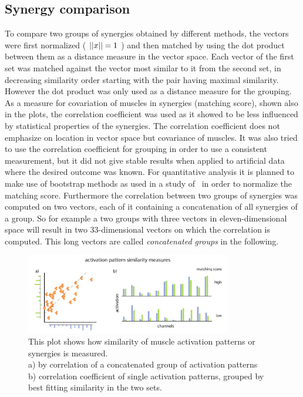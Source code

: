 \subsection{Synergy comparison} %
\label{sg:sub:comp}
To compare two groups of synergies obtained by different methods, the vectors were first normalized ( $\left|\left|x\right|\right| = 1$ ) and then matched by using the dot product between them as a distance measure in the vector space. Each vector of the first set was matched against the vector most similar to it from the second set, in decreasing similarity order starting with the pair having maximal similarity. However the dot product was only used as a distance measure for the grouping. As a measure for covariation of muscles in synergies (matching score), shown also in the plots, the correlation coefficient was used as it showed to be less influenced by statistical properties of the synergies. The correlation coefficient does not emphasize on location in vector space but covariance of muscles. It was also tried to use the correlation coefficient for grouping in order to use a consistent measurement, but it did not give stable results when applied to artificial data where the desired outcome was known. For quantitative analysis it is planned to make use of bootstrap methods as used in a study of~\citet{AdAvella:2005p2330} in order to normalize the matching score. Furthermore the correlation between two groups of synergies was computed on two vectors, each of it containing a concatenation of all synergies of a group. So for example a two groups with three vectors in eleven-dimensional space will result in two 33-dimensional vectors on which the correlation is computed. This long vectors are called \emph{concatenated groups} in the following.
\begin{figure}[ht]
	\centering
		\includegraphics[width=0.8\textwidth]{images/match_explanation.pdf}
	\caption{
This plot shows how similarity of muscle activation patterns or synergies is measured. \\ a) by correlation of a concatenated group of activation patterns \\
b) correlation coefficient of single activation patterns, grouped by best fitting similarity in the two sets. }
	\label{sg:fig:images_match_explanation}
\end{figure}

